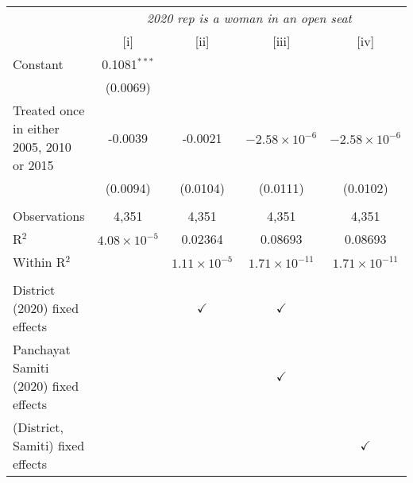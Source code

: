 
\begingroup
\centering
\begin{tabular}{lcccc}
   \toprule
    & \multicolumn{4}{c}{\textit{2020 rep is a woman in an open seat}}\\
                                             & [i]                   & [ii]                  & [iii]                  & [iv]\\  
   \midrule 
   Constant                                  & 0.1081$^{***}$        &                       &                        &   \\   
                                             & (0.0069)              &                       &                        &   \\   
   Treated once in either 2005, 2010 or 2015 & -0.0039               & -0.0021               & $-2.58\times 10^{-6}$  & $-2.58\times 10^{-6}$\\    
                                             & (0.0094)              & (0.0104)              & (0.0111)               & (0.0102)\\   
    \\
   Observations                              & 4,351                 & 4,351                 & 4,351                  & 4,351\\  
   R$^2$                                     & $4.08\times 10^{-5}$  & 0.02364               & 0.08693                & 0.08693\\  
   Within R$^2$                              &                       & $1.11\times 10^{-5}$  & $1.71\times 10^{-11}$  & $1.71\times 10^{-11}$\\   
    \\
   District (2020) fixed effects             &                       & $\checkmark$          & $\checkmark$           & \\  
   Panchayat Samiti (2020) fixed effects     &                       &                       & $\checkmark$           & \\  
   (District, Samiti) fixed effects          &                       &                       &                        & $\checkmark$\\   
   \bottomrule
\end{tabular}
\par\endgroup


